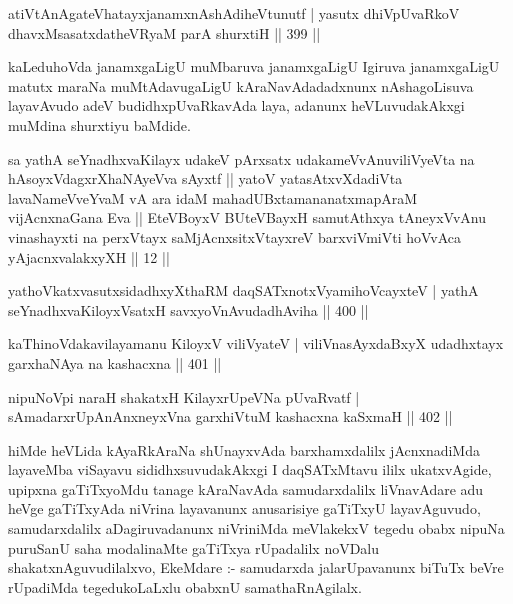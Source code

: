 
\begin{shl}
atiVtAnAgateVhatayxjanamxnAshAdiheVtunutf |
yasutx dhiVpUvaRkoV dhavxMsasatxdatheVRyaM parA shurxtiH \hfill || 399 ||
\end{shl}

\begin{artha}
kaLeduhoVda janamxgaLigU muMbaruva janamxgaLigU Igiruva janamxgaLigU matutx maraNa muMtAdavugaLigU kAraNavAdadadxnunx nAshagoLisuva layavAvudo adeV budidhxpUvaRkavAda laya, adanunx heVLuvudakAkxgi muMdina shurxtiyu baMdide.
\end{artha}


\begin{kandikeshl}
sa yathA seYnadhxvaKilayx udakeV pArxsatx udakameVvAnuviliVyeVta na hAsoyxVdagxrXhaNAyeVva sAyxtf || yatoV yatasAtxvXdadiVta lavaNameVveYvaM vA ara idaM mahadUBxtamananatxmapAraM vijAcnxnaGana Eva || EteVBoyxV BUteVBayxH samutAthxya tAneyxVvAnu vinashayxti na perxVtayx saMjAcnxsitxVtayxreV barxviVmiVti hoVvAca yAjacnxvalakxyXH || 12 ||
\end{kandikeshl}

\begin{shl}
yathoVkatxvasutxsidadhxyXthaRM daqSATxnotxV\s yamihoVcayxteV |
yathA seYnadhxvaKiloyxV\s satxH savxyoVnAvudadhAviha \hfill || 400 ||
\end{shl}

\begin{shl}
kaThinoVdakavilayamanu KiloyxV viliVyateV |
viliVnasAyxdaBxyX udadhxtayx garxhaNAya na kashacxna \hfill || 401 ||
\end{shl}

\begin{shl}
nipuNoV\s pi naraH shakatxH KilayxrUpeVNa pUvaRvatf |
sAmadarxrUpAnAnxneyxVna garxhiVtuM kashacxna kaSxmaH \hfill || 402 ||
\end{shl}

\begin{artha}
hiMde heVLida kAyaRkAraNa shUnayxvAda barxhamxdalilx jAcnxnadiMda layaveMba viSayavu sididhxsuvudakAkxgi I daqSATxMtavu ililx ukatxvAgide, upipxna gaTiTxyoMdu tanage kAraNavAda samudarxdalilx liVnavAdare adu heVge gaTiTxyAda niVrina layavanunx anusarisiye gaTiTxyU layavAguvudo, samudarxdalilx aDagiruvadanunx niVriniMda meVlakekxV tegedu obabx nipuNa puruSanU saha modalinaMte gaTiTxya rUpadalilx noVDalu shakatxnAguvudilalxvo, EkeMdare :- samudarxda jalarUpavanunx biTuTx beVre rUpadiMda tegedukoLaLxlu obabxnU samathaRnAgilalx.
\end{artha}

